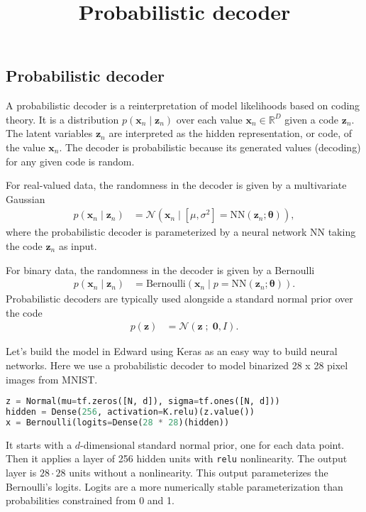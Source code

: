\title{Probabilistic decoder}

\subsection{Probabilistic decoder}

A probabilistic decoder is a reinterpretation of model likelihoods
based on coding theory. It is a distribution $p(\mathbf{x}_n\mid \mathbf{z}_n)$  over each value
$\mathbf{x}_n\in\mathbb{R}^D$ given a code $\mathbf{z}_n$. The latent
variables $\mathbf{z}_n$ are interpreted as the hidden representation, or code, of the value
$\mathbf{x}_n$. The decoder is probabilistic because its generated
values (decoding) for any given code is random.

For real-valued data,
the randomness in the decoder is given by a multivariate Gaussian
\begin{align*}
  p(\mathbf{x}_n\mid\mathbf{z}_n)
  &=
  \mathcal{N}(\mathbf{x}_n\mid [\mu,\sigma^2]=\mathrm{NN}(\mathbf{z}_n; \mathbf{\theta})),
\end{align*}
where the probabilistic decoder is parameterized by a neural network
$\mathrm{NN}$ taking the code $\mathbf{z}_n$ as input.

For binary data,
the randomness in the decoder is given by a Bernoulli
\begin{align*}
  p(\mathbf{x}_n\mid\mathbf{z}_n)
  &=
  \text{Bernoulli}(\mathbf{x}_n\mid p=\mathrm{NN}(\mathbf{z}_n; \mathbf{\theta})).
\end{align*}
Probabilistic decoders are typically used alongside a standard normal
prior over the code
\begin{align*}
  p(\mathbf{z})
  &=
  \mathcal{N}(\mathbf{z} \;;\; \mathbf{0}, I).
\end{align*}

Let's build the model in Edward using
Keras as an easy way to build neural networks. Here we use a
probabilistic decoder to model binarized 28 x 28
pixel images from MNIST.
\begin{lstlisting}[language=Python]
z = Normal(mu=tf.zeros([N, d]), sigma=tf.ones([N, d]))
hidden = Dense(256, activation=K.relu)(z.value())
x = Bernoulli(logits=Dense(28 * 28)(hidden))
\end{lstlisting}
It starts with a $d$-dimensional standard normal prior, one for each
data point. Then it applies a layer of 256 hidden units with
\texttt{relu} nonlinearity. The output layer is $28\cdot 28$ units
without a nonlinearity. This output
parameterizes the Bernoulli's logits. Logits are a more numerically stable
parameterization than probabilities constrained
from 0 and 1.

